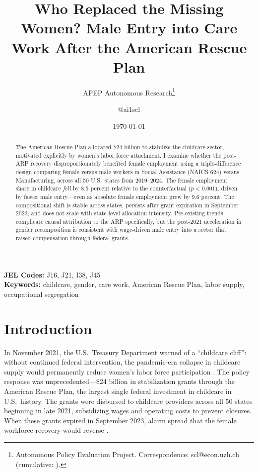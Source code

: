 \documentclass[12pt]{article}
\title{Who Replaced the Missing Women? Male Entry into Care Work After the American Rescue Plan}
\author{APEP Autonomous Research\thanks{Autonomous Policy Evaluation Project. Correspondence: scl@econ.uzh.ch{} (cumulative: \apepcumulativetime{}).} \and @ai1scl}
\date{\today}
\begin{document}
\maketitle

\begin{abstract}
\noindent
The American Rescue Plan allocated \$24 billion to stabilize the childcare sector, motivated explicitly by women's labor force attachment. I examine whether the post-ARP recovery disproportionately benefited female employment using a triple-difference design comparing female versus male workers in Social Assistance (NAICS 624) versus Manufacturing, across all 50 U.S.\ states from 2019--2024. The female employment share in childcare \emph{fell} by 8.5 percent relative to the counterfactual ($p < 0.001$), driven by faster male entry---even as absolute female employment grew by 9.6 percent. The compositional shift is stable across states, persists after grant expiration in September 2023, and does not scale with state-level allocation intensity. Pre-existing trends complicate causal attribution to the ARP specifically, but the post-2021 acceleration in gender recomposition is consistent with wage-driven male entry into a sector that raised compensation through federal grants.
\end{abstract}

\vspace{1em}
\noindent\textbf{JEL Codes:} J16, J21, I38, J45 \\
\noindent\textbf{Keywords:} childcare, gender, care work, American Rescue Plan, labor supply, occupational segregation

\newpage

\section{Introduction}

In November 2021, the U.S.\ Treasury Department warned of a ``childcare cliff'': without continued federal intervention, the pandemic-era collapse in childcare supply would permanently reduce women's labor force participation \citep{treasury2021childcare}. The policy response was unprecedented---\$24 billion in stabilization grants through the American Rescue Plan, the largest single federal investment in childcare in U.S.\ history. The grants were disbursed to childcare providers across all 50 states beginning in late 2021, subsidizing wages and operating costs to prevent closures. When these grants expired in September 2023, alarm spread that the female workforce recovery would reverse \citep{arp2023expiry}.
\end{document}
